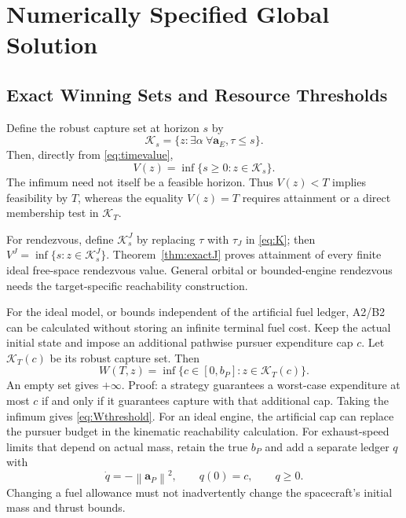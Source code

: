 \documentclass[journal,a4paper]{IEEEtran}
\newcommand{\norm}[1]{\left\|#1\right\|}
\begin{document}
\section{Numerically Specified Global Solution}
\label{sec:numerical}
\subsection{Exact Winning Sets and Resource Thresholds}
Define the robust capture set at horizon $s$ by
\begin{equation}
 \mathcal K_s=\{z:\exists\alpha\ \forall\mathbf a_E,
                                     \tau\le s\}.
 \label{eq:K}
\end{equation}
Then, directly from \eqref{eq:timevalue},
\begin{equation}
 \boxed{V(z)=\inf\{s\ge0:z\in\mathcal K_s\}.}
 \label{eq:VfromK}
\end{equation}
The infimum need not itself be a feasible horizon. Thus $V(z)<T$ implies feasibility by $T$, whereas the equality $V(z)=T$ requires attainment or a direct membership test in $\mathcal K_T$.

For rendezvous, define $\mathcal K_s^J$ by replacing $\tau$ with $\tau_J$ in \eqref{eq:K}; then $V^J=\inf\{s:z\in\mathcal K_s^J\}$. Theorem~\ref{thm:exactJ} proves attainment of every finite ideal free-space rendezvous value. General orbital or bounded-engine rendezvous needs the target-specific reachability construction.

For the ideal model, or bounds independent of the artificial fuel ledger, A2/B2 can be calculated without storing an infinite terminal fuel cost. Keep the actual initial state and impose an additional pathwise pursuer expenditure cap $c$. Let $\mathcal K_T(c)$ be its robust capture set. Then
\begin{equation}
 \boxed{W(T,z)=\inf\{c\in[0,b_P]:z\in\mathcal K_T(c)\}.}
 \label{eq:Wthreshold}
\end{equation}
An empty set gives $+\infty$. Proof: a strategy guarantees a worst-case expenditure at most $c$ if and only if it guarantees capture with that additional cap. Taking the infimum gives \eqref{eq:Wthreshold}. For an ideal engine, the artificial cap can replace the pursuer budget in the kinematic reachability calculation. For exhaust-speed limits that depend on actual mass, retain the true $b_P$ and add a separate ledger $q$ with
\begin{equation}
 \dot q=-\norm{\mathbf a_P}^2,\qquad q(0)=c,\qquad q\ge0.
\end{equation}
Changing a fuel allowance must not inadvertently change the spacecraft's initial mass and thrust bounds.
\end{document}

